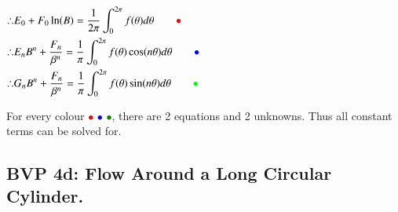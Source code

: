 \documentclass{report}
\begin{document}
$\begin{aligned}
\therefore & E_{0}+F_{0} \ln (B)=\dfrac{1}{2 \pi} \displaystyle\int_{0}^{2 \pi} f(\theta) d \theta\qquad\textcolor{red}{\bullet} \\
\therefore & E_{n} B^{n}+\dfrac{F_{n}}{\beta^{n}}=\dfrac{1}{\pi} \displaystyle\int_{0}^{2 \pi} f(\theta) \cos (n \theta) d \theta\qquad\textcolor{blue}{\bullet} \\
\therefore & G_{n} B^{n}+\dfrac{F_{n}}{\beta^{n}}=\dfrac{1}{\pi} \displaystyle\int_{0}^{2 \pi} f(\theta) \sin (n \theta) d \theta\qquad\textcolor{green}{\bullet}
\end{aligned}
$

For every colour \qquad\textcolor{red}{$\bullet$} \qquad\textcolor{blue}{$\bullet$} \qquad\textcolor{green}{$\bullet$}, there are 2 equations and 2 unknowns. Thus all constant terms can be solved for.

\subsection{BVP 4d: Flow Around a Long Circular Cylinder.}
\end{document}
